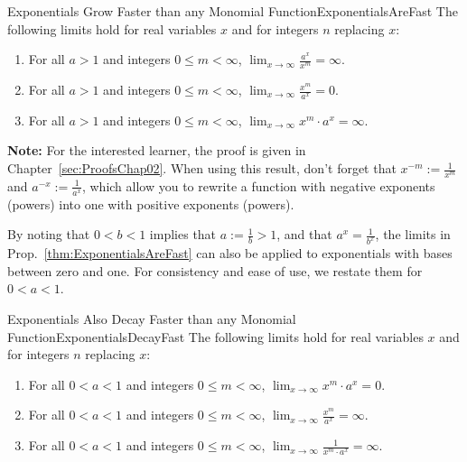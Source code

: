 \begin{propColor}{Exponentials Grow Faster than any Monomial Function}{ExponentialsAreFast}
The following limits hold for real variables $x$ and for integers $n$ replacing $x$: 
\begin{enumerate}
\renewcommand{\labelenumi}{(\alph{enumi})}
\setlength{\itemsep}{.2cm}
    \item For all $a>1$ and integers $0 \le m < \infty$, $\displaystyle{\lim_{x \to \infty}} \frac{a^x}{x^m} = \infty$.
     \item For all $a > 1$ and integers $0 \le m < \infty$, $\displaystyle{\lim_{x \to \infty}}  \frac{x^m}{a^x} = 0$.
    \item For all $a > 1$ and integers $0 \le m < \infty$, $\displaystyle{\lim_{x \to \infty}}  {x^m} \cdot {a^x} = \infty$.
\end{enumerate}

\textbf{Note:} For the interested learner, the proof is given in Chapter~\ref{sec:ProofsChap02}. When using this result, don't forget that $x^{-m}:= \frac{1}{x^m}$ and $a^{-x}:= \frac{1}{a^x}$, which allow you to rewrite a function with negative exponents (powers) into one with positive exponents (powers).
\end{propColor}

\bigskip

By noting that $0 < b < 1$ implies that $a:=\frac{1}{b} > 1$, and that $a^x = \frac{1}{b^x}$, the limits in Prop.~\ref{thm:ExponentialsAreFast} can also be applied to exponentials with bases between zero and one. For consistency and ease of use, we restate them for $0 < a < 1$.  

\bigskip

\begin{corColor}{Exponentials Also Decay Faster than any Monomial Function}{ExponentialsDecayFast}  
The following limits hold for real variables $x$ and for integers $n$ replacing $x$: 
\begin{enumerate}
\renewcommand{\labelenumi}{(\alph{enumi})}
\setlength{\itemsep}{.2cm}
    \item For all $0< a<1$ and integers $0 \le m < \infty$, $\displaystyle{\lim_{x \to \infty}} {x^m} \cdot {a^x} = 0$.
      \item For all $0 < a <1 $ and integers $0 \le m < \infty$, $\displaystyle{\lim_{x \to \infty}}  \frac{x^m}{a^x} = \infty$.
        \item For all $0 < a <1 $ and integers $0 \le m < \infty$, $\displaystyle{\lim_{x \to \infty}}  \frac{1}{x^m \cdot a^x} = \infty$.
    \end{enumerate}
\end{corColor}

